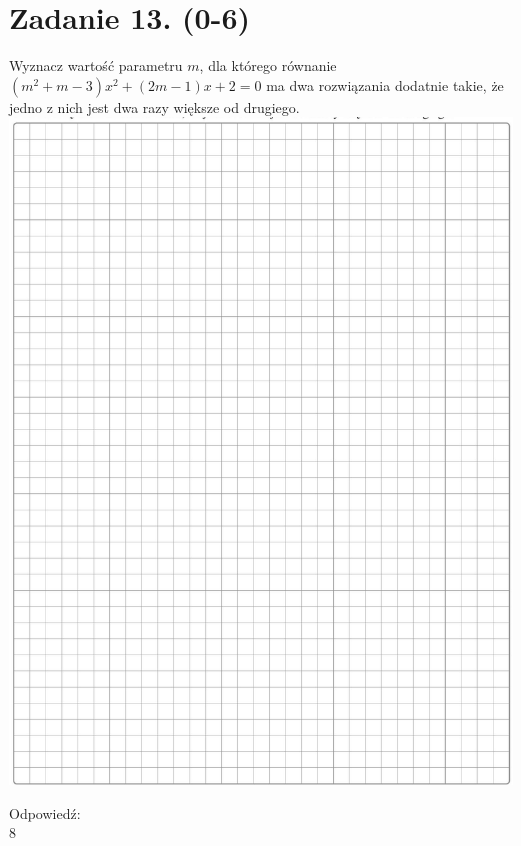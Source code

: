 \documentclass[10pt]{article}
\begin{document}
\section*{Zadanie 13. (0-6)}
Wyznacz wartość parametru \(m\), dla którego równanie \(\left(m^{2}+m-3\right) x^{2}+(2 m-1) x+2=0\) ma dwa rozwiązania dodatnie takie, że jedno z nich jest dwa razy większe od drugiego.\\
\includegraphics[max width=\textwidth, center]{2024_11_21_d15133c79177ee6989d3g-08}

Odpowiedź:\\
8
\end{document}

